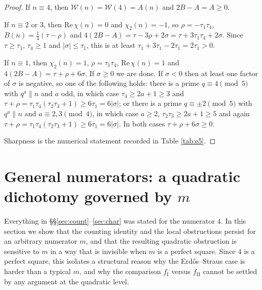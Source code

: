 \documentclass[11pt,reqno]{amsart}
\theoremstyle{plain}
\theoremstyle{definition}
\numberwithin{equation}{section}
\newcommand{\fI}{f_{\mathrm{I}}}
\newcommand{\fII}{f_{\mathrm{II}}}
\begin{document}
\begin{proof}
If $n\equiv4$, then $\mathcal W(n)=\mathcal W(4)=A(n)$ and $2B-A=A\ge0$.

If $n\equiv2$ or $3$, then $\mathrm{Re}\,\chi(n)=0$ and $\chi_{2}(n)=-1$, so
$\rho=-\tau_{1}\tau_{4}$, $B(n)=\tfrac14(\tau-\rho)$ and
$4(2B-A)=\tau-3\rho+2\sigma=\tau+3\tau_{1}\tau_{4}+2\sigma$. Since
$\tau\ge\tau_{1}$, $\tau_{4}\ge1$ and $|\sigma|\le\tau_{1}$, this is at least
$\tau_{1}+3\tau_{1}-2\tau_{1}=2\tau_{1}>0$.

If $n\equiv1$, then $\chi_{2}(n)=1$, $\rho=\tau_{1}\tau_{4}$,
$\mathrm{Re}\,\chi(n)=1$ and $4(2B-A)=\tau+\rho+6\sigma$. If $\sigma\ge0$ we are done.
If $\sigma<0$ then at least one factor of $\sigma$ is negative, so one of the
following holds: there is a prime $q\equiv4\pmod5$ with $q^{a}\|n$ and $a$ odd, in
which case $\tau_{4}\ge2a+1\ge3$ and
$\tau+\rho=\tau_{1}\tau_{4}(\tau_{2}\tau_{3}+1)\ge6\tau_{1}=6|\sigma|$; or there is a
prime $q\equiv\pm2\pmod5$ with $q^{a}\|n$ and $a\equiv2,3\pmod4$, in which case
$a\ge2$, $\tau_{2}\tau_{3}\ge2a+1\ge5$ and again
$\tau+\rho=\tau_{1}\tau_{4}(\tau_{2}\tau_{3}+1)\ge6\tau_{1}=6|\sigma|$. In both cases
$\tau+\rho+6\sigma\ge0$.

Sharpness is the numerical statement recorded in Table \ref{tab:e5}.
\end{proof}

\section{General numerators: a quadratic dichotomy governed by $m$}\label{sec:gm}

Everything in \S\S\ref{sec:count}--\ref{sec:char} was stated for the numerator $4$.
In this section we show that the counting identity and the local obstructions persist
for an arbitrary numerator $m$, and that the resulting quadratic obstruction is
sensitive to $m$ in a way that is invisible when $m$ is a perfect square. Since $4$ is
a perfect square, this isolates a structural reason why the Erd\H{o}s--Straus case is
harder than a typical $m$, and why the comparison $\fI$ versus $\fII$ cannot be settled
by any argument at the quadratic level.
\end{document}
